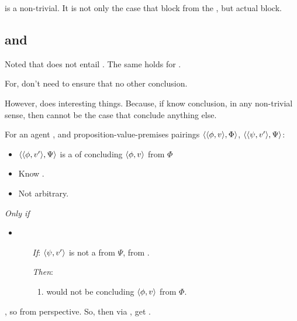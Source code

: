 \begin{note}
  \feedback{} is a non-trivial.
  It is not only the case that block from the \agpe{}, but actual block.
\end{note}

\subsection{ and }
\label{sec:fc}

\begin{note}
  Noted that \curb{} does not entail \fc{}.
  The same holds for .

  For, don't need to ensure that no other conclusion.

  However,  does interesting things.
  Because, if know conclusion, in any non-trivial sense, then cannot be the case that conclude anything else.
\end{note}


\begin{note}
  \begin{proposition}
    For an agent \vAgent{}, and proposition-value-premises pairings \(\langle \langle \phi, v \rangle, \Phi \rangle\), \(\langle \langle \psi, v' \rangle, \Psi \rangle\):

    \begin{itemize}
    \item
      \(\langle \langle \phi, v' \rangle, \Psi \rangle\) is a \requ{} of \vAgent{} concluding \(\langle \phi, v \rangle\) from \(\Phi\)
    \item
      Know \pevent{}.
    \item
      Not arbitrary.
    \end{itemize}

    \emph{Only if}

    \begin{itemize}
    \item
        \begin{enumerate}
        \item[\emph{If}:]
          \(\langle \psi, v' \rangle\) is not a \fc{} from \(\Psi\), from .
        \item[\emph{Then}:]
          \begin{enumerate}[label=\alph*., ref=(\alph*), resume]
          \item
            \label{def:curb:fail}
            \vAgent{} would not be concluding \(\langle \phi, v \rangle\) from \(\Phi\).
          \end{enumerate}
      \end{enumerate}
    \end{itemize}
    \begin{argument}
      \requ{}, so \curb{} from perspective.
      So, then via , get \curb{}.
    \end{argument}
  \end{proposition}
\end{note}

